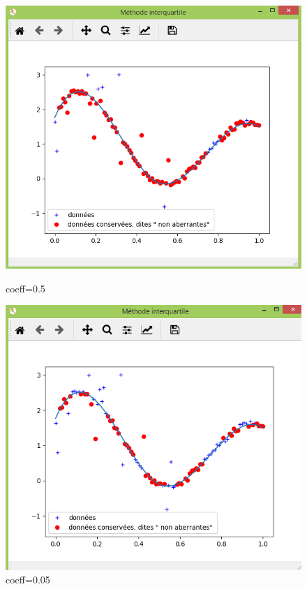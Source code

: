 \documentclass[11pt]{report}
\begin{document}
\begin{figure}[!htb]
  \includegraphics[width=\linewidth]{quan.png}
  \caption{coeff=0.5}\label{fig:awesome_image1}
\endminipage\hfill
{}
  \includegraphics[width=\linewidth]{quam.png}
  \caption{coeff=0.05}\label{fig:awesome_image2}
\endminipage\hfill
\end{figure}
\end{document}
